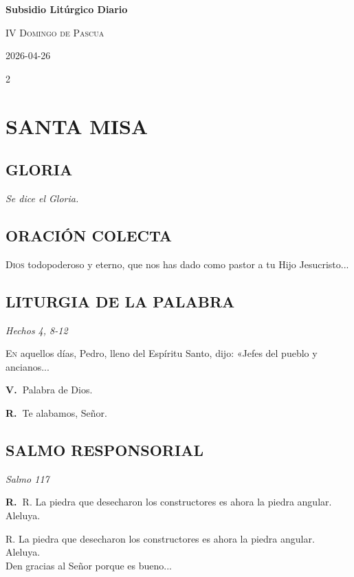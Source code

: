 \documentclass[11pt, letterpaper, twoside]{article}
\newcommand{\rubrica}[1]{\textcolor{rubricred}{\small\textit{#1}}}
\newcommand{\vers}{\textcolor{rubricred}{\textbf{V.\ }}}
\newcommand{\resp}{\textcolor{rubricred}{\textbf{R.\ }}}
\begin{document}
\begin{center}
    {\Huge\textbf{Subsidio Litúrgico Diario}\par}
    \vspace{0.3cm}
    {\large\textsc{IV Domingo de Pascua}\par}
    {\small 2026-04-26\par}
\end{center}

\vspace{0.8cm}

\begin{multicols}{2}
\RaggedRight


\section*{SANTA MISA}





\subsection*{GLORIA}
\noindent\rubrica{Se dice el Gloria.} \par\vspace{0.3cm}

\subsection*{ORACIÓN COLECTA}
\lettrine{D}{ios} todopoderoso y eterno, que nos has dado como pastor a tu Hijo Jesucristo...

\subsection*{LITURGIA DE LA PALABRA}
\noindent\rubrica{Hechos 4, 8-12} \par\vspace{0.2cm}
\lettrine{E}{n} aquellos días, Pedro, lleno del Espíritu Santo, dijo: «Jefes del pueblo y ancianos... \par\vspace{0.2cm}
\vers Palabra de Dios. \par
\resp Te alabamos, Señor.

\subsection*{SALMO RESPONSORIAL}
\noindent\rubrica{Salmo 117} \par\vspace{0.1cm}
\resp R. La piedra que desecharon los constructores es ahora la piedra angular. Aleluya. \par\vspace{0.2cm}
\lettrine{R}{.} La piedra que desecharon los constructores es ahora la piedra angular. Aleluya. \\ 
Den gracias al Señor porque es bueno...


\end{multicols}
\end{document}
